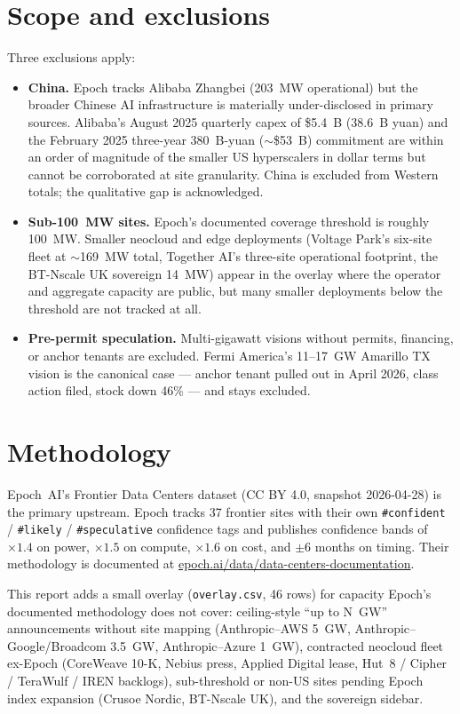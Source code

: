 \documentclass[11pt]{article}
\begin{document}
\section{Scope and exclusions}\label{sec:scope}
\noindent Three exclusions apply:
\begin{itemize}
\item \textbf{China.} Epoch tracks Alibaba Zhangbei (203~MW operational) but the broader Chinese AI infrastructure is materially under-disclosed in primary sources. Alibaba's August 2025 quarterly capex of \$5.4~B (38.6~B yuan) and the February 2025 three-year 380~B-yuan ($\sim$\$53~B) commitment are within an order of magnitude of the smaller US hyperscalers in dollar terms but cannot be corroborated at site granularity. China is excluded from Western totals; the qualitative gap is acknowledged.
\item \textbf{Sub-100~MW sites.} Epoch's documented coverage threshold is roughly 100~MW. Smaller neocloud and edge deployments (Voltage Park's six-site fleet at $\sim$169~MW total, Together AI's three-site operational footprint, the BT-Nscale UK sovereign 14~MW) appear in the overlay where the operator and aggregate capacity are public, but many smaller deployments below the threshold are not tracked at all.
\item \textbf{Pre-permit speculation.} Multi-gigawatt visions without permits, financing, or anchor tenants are excluded. Fermi America's 11--17~GW Amarillo TX vision is the canonical case --- anchor tenant pulled out in April 2026, class action filed, stock down 46\% --- and stays excluded.
\end{itemize}
\section{Methodology}\label{sec:methodology}
\noindent Epoch~AI's Frontier Data Centers dataset (CC BY 4.0, snapshot 2026-04-28) is the primary upstream. Epoch tracks 37 frontier sites with their own \texttt{\#confident} / \texttt{\#likely} / \texttt{\#speculative} confidence tags and publishes confidence bands of $\times 1.4$ on power, $\times 1.5$ on compute, $\times 1.6$ on cost, and $\pm 6$ months on timing. Their methodology is documented at \href{https://epoch.ai/data/data-centers-documentation}{epoch.ai/data/data-centers-documentation}.

This report adds a small overlay (\texttt{overlay.csv}, 46 rows) for capacity Epoch's documented methodology does not cover: ceiling-style ``up to N~GW'' announcements without site mapping (Anthropic--AWS 5~GW, Anthropic--Google/Broadcom 3.5~GW, Anthropic--Azure 1~GW), contracted neocloud fleet ex-Epoch (CoreWeave 10-K, Nebius press, Applied Digital lease, Hut~8 / Cipher / TeraWulf / IREN backlogs), sub-threshold or non-US sites pending Epoch index expansion (Crusoe Nordic, BT-Nscale UK), and the sovereign sidebar.
\end{document}

